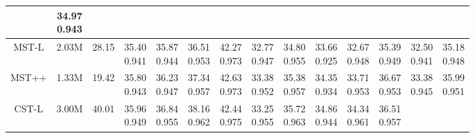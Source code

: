 \documentclass{article}
\begin{document}
\begin{table*}[t]
{\begin{tabular}{cccccccccccccc}
			&\tabincell{c}{34.97\\0.943}
			\\
			\midrule
			MST-L \cite{mst}
			& 2.03M
			& 28.15
			&\tabincell{c}{35.40\\0.941}
			&\tabincell{c}{35.87\\0.944}
			&\tabincell{c}{36.51\\0.953}
			&\tabincell{c}{42.27\\0.973}
			&\tabincell{c}{32.77\\0.947}
			&\tabincell{c}{34.80\\0.955}
			&\tabincell{c}{33.66\\0.925}
			&\tabincell{c}{32.67\\0.948}
			&\tabincell{c}{35.39\\0.949}
			&\tabincell{c}{32.50\\0.941}
			&\tabincell{c}{35.18\\0.948}
			\\
			\midrule
			MST++ \cite{mst_pp}
			& 1.33M
			& 19.42
			&\tabincell{c}{35.80\\0.943}
			&\tabincell{c}{36.23\\0.947}
			&\tabincell{c}{37.34\\0.957}
			&\tabincell{c}{42.63\\0.973}
			&\tabincell{c}{33.38\\0.952}
			&\tabincell{c}{35.38\\0.957}
			&\tabincell{c}{34.35\\0.934}
			&\tabincell{c}{33.71\\0.953}
			&\tabincell{c}{36.67\\0.953}
			&\tabincell{c}{33.38\\0.945}
			&\tabincell{c}{35.99\\0.951}
			\\
			\midrule
			CST-L \cite{mst_pp}
			& 3.00M
			& 40.01
			&\tabincell{c}{35.96\\0.949}
			&\tabincell{c}{36.84\\0.955}
			&\tabincell{c}{38.16\\0.962}
			&\tabincell{c}{42.44\\0.975}
			&\tabincell{c}{33.25\\0.955}
			&\tabincell{c}{35.72\\0.963}
			&\tabincell{c}{34.86\\0.944}
			&\tabincell{c}{34.34\\0.961}
			&\tabincell{c}{36.51\\0.957}

\end{tabular}}
\end{table*}
\end{document}

